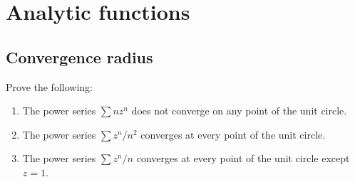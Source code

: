 \documentclass[11pt,a4paper]{article}
\begin{document}
\newpage

\section{Analytic functions}
\subsection{Convergence radius}

\begin{exercise}
  Prove the following:
  \begin{enumerate}
    \item[(a)] The power series $\sum n z^n$
      does not converge on any point of the unit circle.
    \item[(b)] The power series $\sum z^n/n^2$
      converges at every point of the unit circle.
    \item[(c)] The power series $\sum z^n/n$
      converges at every point of the unit circle except $z = 1$.
  \end{enumerate}
\end{exercise}
\end{document}

